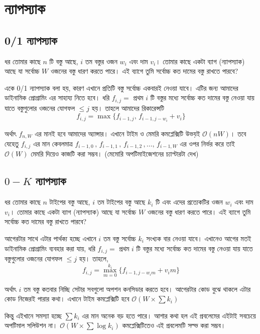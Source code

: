 \chapter{ন্যাপস্যাক}
\section{0/1 ন্যাপস্যাক}
ধর তোমার কাছে \(n\) টি বস্তু আছে, \(i\) তম বস্তুর ওজন \(w_{i}\) এবং দাম \(v_{i}\)। তোমার কাছে একটা ব্যাগ (ন্যাপস্যাক) আছে যা সর্বোচ্চ \(W\) ওজনের বস্তু ধারণ করতে পারে। এই ব্যাগে তুমি সর্বোচ্চ কত দামের বস্তু রাখতে পারবে?

একে 0/1 ন্যাপস্যাক বলা হয়, কারণ এখানে প্রতিটি বস্তু সর্বোচ্চ একবারই নেওয়া যাবে। এটির জন্য আমাদের ডাইনামিক প্রোগ্রামিং এর সাহায্য নিতে হবে। ধরি \(f_{i, j} = \) প্রথম \(i\) টি বস্তুর মধ্যে সর্বোচ্চ কত দামের বস্তু নেওয়া যায় যাতে বস্তুগুলোর ওজনের যোগফল \(\leq j\) হয়। তাহলে আমাদের রিকারেন্সটি
\[f_{i, j} = \max \lbrace f_{i - 1, j}, \, f_{i - 1, j - w_{i}} + v_{i} \rbrace\]

অর্থাৎ \(f_{n, W}\) এর মানই হবে আমাদের অ্যান্সার। এখানে টাইম ও মেমরি কমপ্লেক্সিটি উভয়ই \(\mathcal{O}(nW)\)।
তবে যেহেতু \(f_{i, j}\) এর মান কেবলমাত্র \(f_{i - 1, 0} \, , \, f_{i - 1, 1} \, , \, f_{i - 1, 2} \, , \dots, \, f_{i - 1, W}\) এর ওপর নির্ভর করে তাই \(\mathcal{O}(W)\) মেমরি দিয়েও কাজটি করা সম্ভব। (মেমোরি অপটিমাইজেশনের চ্যাপ্টারটা দেখ) 

\section{\texorpdfstring{$0-K$}{0-K} ন্যাপস্যাক}
ধর তোমার কাছে \(n\) টাইপের বস্তু আছে, \(i\) তম টাইপের বস্তু আছে \(k_{i}\) টি এবং এদের প্রত্যেকটির ওজন \(w_{i}\) এবং দাম \(v_{i}\)। তোমার কাছে একটা ব্যাগ (ন্যাপস্যাক) আছে যা সর্বোচ্চ \(W\) ওজনের বস্তু ধারণ করতে পারে। এই ব্যাগে তুমি সর্বোচ্চ কত দামের বস্তু রাখতে পারবে?

আগেরটার সাথে এটার পার্থক্য হচ্ছে এখানে \(i\) তম বস্তু সর্বোচ্চ \(k_{i}\) সংখ্যক বার নেওয়া যাবে। এখানেও আগের মতই ডাইনামিক প্রোগ্রামিং ব্যবহার করা যায়, ধরি \(f_{i, j} = \) প্রথম \(i\) টি বস্তুর মধ্যে সর্বোচ্চ কত দামের বস্তু নেওয়া যায় যাতে বস্তুগুলোর ওজনের যোগফল \(\leq j\) হয়। তাহলে, 
\[f_{i, j} = \max_{m = 0}^{k_{i}} \lbrace f_{i - 1, j - w_{i}m} + v_{i}m \rbrace\]

অর্থাৎ \(i\) তম বস্তু কতবার নিচ্ছি সেটার সবগুলো অপশন কনসিডার করতে হবে। আগেরটার কোড বুঝে থাকলে এটার কোড নিজেরই পারার কথা। এখানে টাইম কমপ্লেক্সিটি হবে \(\mathcal{O}(W \times \sum k_{i})\) 

কিন্তু এইখানে সমস্যা হচ্ছে \(\sum k_{i}\) এর মান অনেক বড় হতে পারে। আশার কথা হল এই প্রবলেমের এইটাই সবচেয়ে অপটিমাল সলিউশন না। \(\mathcal{O}(W \times \sum \log k_{i})\) কমপ্লেক্সিটিতেও এই প্রবলেমটি সল্ভ করা সম্ভব।

